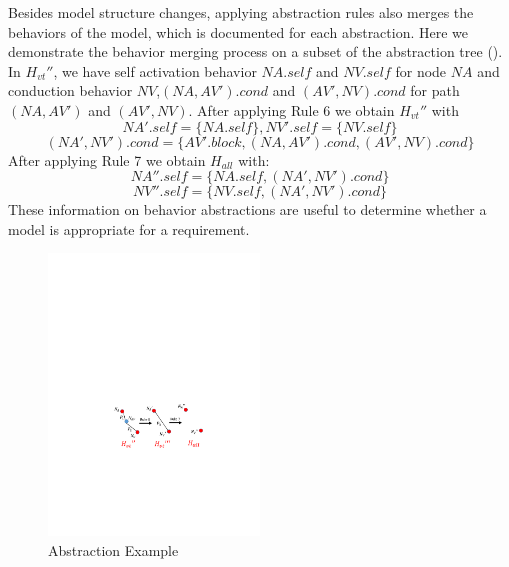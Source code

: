 Besides model structure changes, applying abstraction rules also merges the behaviors of the model, which is documented for each abstraction. Here we demonstrate the behavior merging process on a subset of the abstraction tree (). In $H_{vt}''$, we have self activation behavior $NA.self$ and $NV.self$ for node $NA$ and conduction behavior $NV$,$(NA,AV').cond$ and $(AV',NV).cond$ for path $(NA,AV')$ and $(AV',NV)$. After applying Rule 6 we obtain $H_{vt}''$ with
$$NA'.self=\{NA.self\},NV'.self=\{NV.self\}$$
$$(NA',NV').cond=\{AV'.block,(NA,AV').cond,(AV',NV).cond\}$$
After applying Rule 7 we obtain $H_{all}$ with:
$$NA''.self=\{NA.self,(NA',NV').cond\}$$
$$NV''.self=\{NV.self,(NA',NV').cond\}$$
These information on behavior abstractions are useful to determine whether a model is appropriate for a requirement.
\begin{figure}[!t]
	\centering
	\includegraphics[width=0.5\textwidth]{figs/abs_sim.pdf}
	\caption{\small Abstraction Example}
	\label{fig:abs_exam}
\end{figure}
